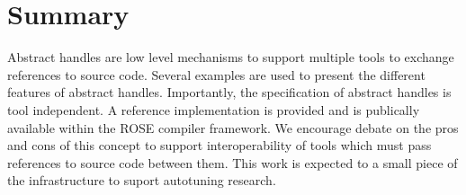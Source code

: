 \clearpage
\section{Summary}

   Abstract handles are low level mechanisms to support multiple tools
to exchange references to source code.  Several examples are used to
present the different features of abstract handles.  Importantly, the 
specification of abstract handles is tool independent.  A reference
implementation is provided and is publically available within the
ROSE compiler framework.  We encourage debate on the pros and cons
of this concept to support interoperability of tools which must
pass references to source code between them.  This work is expected
to a small piece of the infrastructure to suport autotuning research.


